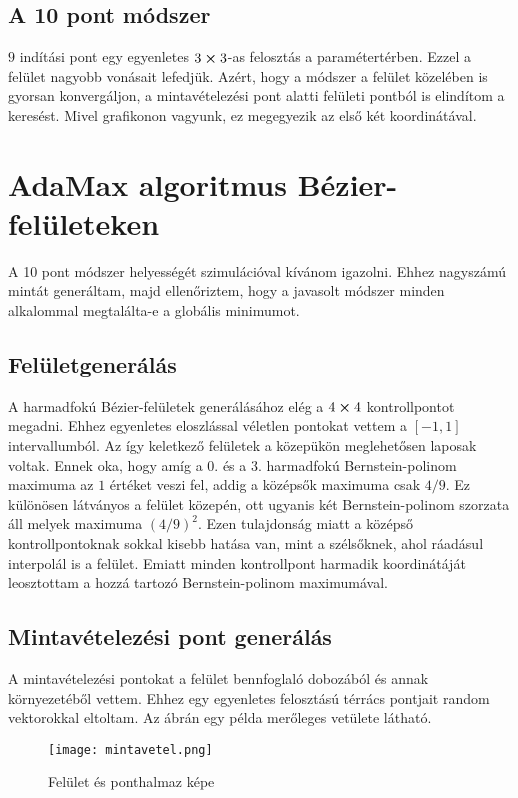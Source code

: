\subsection{A 10 pont módszer}
$9$ indítási pont egy egyenletes $3\cross3$-as felosztás a paramétertérben. Ezzel a felület nagyobb vonásait lefedjük. Azért, hogy a módszer a felület közelében is gyorsan konvergáljon, a mintavételezési pont alatti felületi pontból is elindítom a keresést. Mivel grafikonon vagyunk, ez megegyezik az első két koordinátával.



\section{AdaMax algoritmus Bézier-felületeken}
A 10 pont módszer helyességét szimulációval kívánom igazolni. Ehhez nagyszámú mintát generáltam, majd ellenőriztem, hogy a javasolt módszer minden alkalommal megtalálta-e a globális minimumot.

\subsection{Felületgenerálás}
A harmadfokú Bézier-felületek generálásához elég a $4\cross4$ kontrollpontot megadni. Ehhez egyenletes eloszlással véletlen pontokat vettem a $[-1,1]$ intervallumból. Az így keletkező felületek a közepükön meglehetősen laposak voltak. Ennek oka, hogy amíg a  $0.$ és a $3.$ harmadfokú Bernstein-polinom maximuma az $1$ értéket veszi fel, addig a középsők maximuma csak $4/9$. Ez különösen látványos a felület közepén, ott ugyanis két Bernstein-polinom szorzata áll melyek maximuma $(4/9)^2$. Ezen tulajdonság miatt a középső kontrollpontoknak sokkal kisebb hatása van, mint a szélsőknek, ahol ráadásul interpolál is a felület. Emiatt minden kontrollpont harmadik koordinátáját leosztottam a hozzá tartozó Bernstein-polinom maximumával.

\subsection{Mintavételezési pont generálás}
A mintavételezési pontokat a felület bennfoglaló dobozából és annak környezetéből vettem. Ehhez egy egyenletes felosztású térrács pontjait random vektorokkal eltoltam. Az ábrán egy példa merőleges vetülete látható.
\begin{figure}[H]
	\centering
	\texttt{[image: mintavetel.png]}
	\caption{Felület és ponthalmaz képe}
\end{figure}

